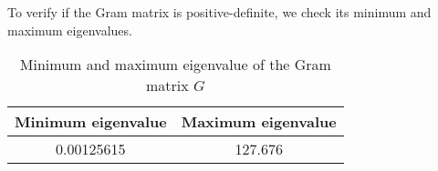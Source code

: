 To verify if the Gram matrix is positive-definite, we check its minimum and maximum eigenvalues.

\begin{table} 
    \begin{tabular}{ | c | c | }
        \hline
        Minimum eigenvalue & Maximum eigenvalue \\ \hline
        0.00125615 & 127.676 \\ \hline
    \end{tabular} 
    \caption{Minimum and maximum eigenvalue of the Gram matrix $G$} 
\end{table}
